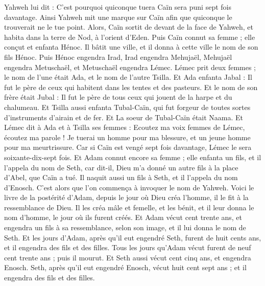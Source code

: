 \begin{multicols}{2}
Yahweh lui dit : C'est pourquoi quiconque tuera Caïn sera puni sept fois davantage. Ainsi Yahweh mit une marque sur Caïn afin que quiconque le trouverait ne le tue point.
Alors, Caïn sortit de devant de la face de Yahweh, et habita dans la terre de Nod, à l'orient d'Eden.
Puis Caïn connut sa femme ; elle conçut et enfanta Hénoc. Il bâtit une ville, et il donna à cette ville le nom de son fils Hénoc.
Puis Hénoc engendra Irad, Irad engendra Mehujaël, Mehujaël engendra Metuschaël, et Metuschaël engendra Lémec.
Lémec prit deux femmes ; le nom de l'une était Ada, et le nom de l'autre Tsilla.
Et Ada enfanta Jabal : Il fut le père de ceux qui habitent dans les tentes et des pasteurs.
Et le nom de son frère était Jubal : Il fut le père de tous ceux qui jouent de la harpe et du chalumeau.
Et Tsilla aussi enfanta Tubal-Caïn, qui fut forgeur de toutes sortes d'instruments d'airain et de fer. Et La soeur de Tubal-Caïn était Naama.
Et Lémec dit à Ada et à Tsilla ses femmes : Ecoutez ma voix femmes de Lémec, écoutez ma parole ! Je tuerai un homme pour ma blessure, et un jeune homme pour ma meurtrissure.
Car si Caïn est vengé sept fois davantage, Lémec le sera soixante-dix-sept fois.
Et Adam connut encore sa femme ; elle enfanta un fils, et il l'appela du nom de Seth, car dit-il, Dieu m'a donné un autre fils à la place d'Abel, que Caïn a tué.
Il naquit aussi un fils à Seth, et il l'appela du nom d'Enosch. C'est alors que l'on commença à invoquer le nom de Yahweh.
\VerseOne{}Voici le livre de la postérité d'Adam, depuis le jour où Dieu créa l'homme, il le fit à la ressemblance de Dieu.
Il les créa mâle et femelle, et les bénit, et il leur donna le nom d'homme, le jour où ils furent créés.
Et Adam vécut cent trente ans, et engendra un fils à sa ressemblance, selon son image, et il lui donna le nom de Seth.
Et les jours d'Adam, après qu'il eut engendré Seth, furent de huit cents ans, et il engendra des fils et des filles.
Tous les jours qu'Adam vécut furent de neuf cent trente ans ; puis il mourut.
Et Seth aussi vécut cent cinq ans, et engendra Enosch.
Seth, après qu'il eut engendré Enosch, vécut huit cent sept ans ; et il engendra des fils et des filles.

\end{multicols}
